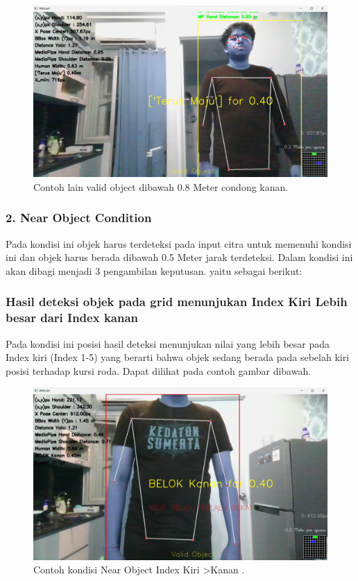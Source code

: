 \begin{figure}[H]
  \centering
  \includegraphics[scale=0.3]{gambar/posisikuning kanan.png}
  \caption{Contoh lain valid object dibawah 0.8 Meter condong kanan.}
  \label{fig:Valid object dibawah 0.8 Meter.}
\end{figure}

\subsubsection{2. Near Object Condition}
Pada kondisi ini objek harus terdeteksi pada input citra untuk memenuhi kondisi ini dan objek harus berada dibawah 0.5 Meter jarak terdeteksi. Dalam kondisi ini akan dibagi menjadi 3 pengambilan keputusan. yaitu sebagai berikut: 

\subsubsection*{Hasil deteksi objek pada grid menunjukan Index Kiri Lebih besar dari Index kanan}
Pada kondisi ini posisi hasil deteksi menunjukan nilai yang lebih besar pada Index kiri (Index 1-5) yang berarti bahwa objek sedang berada pada sebelah kiri posisi terhadap kursi roda. Dapat dilihat pada contoh gambar dibawah.

\begin{figure}[H]
  \centering
  \includegraphics[scale=0.3]{gambar/merahkiri.png}
  \caption{Contoh kondisi Near Object Index Kiri \textgreater Kanan .}
  \label{fig:Valid object dibawah 0.8 Meter.}
\end{figure}

